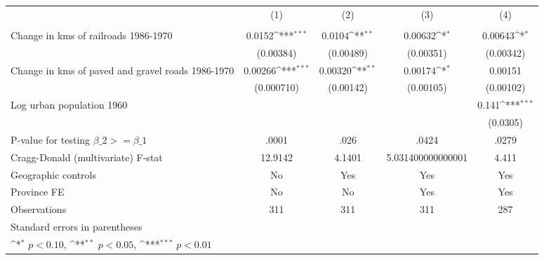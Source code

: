 {
\def\sym#1{\ifmmode^{#1}\else\(^{#1}\)\fi}
\begin{tabular}{l*{4}{c}}
\hline\hline
                &\multicolumn{1}{c}{(1)}&\multicolumn{1}{c}{(2)}&\multicolumn{1}{c}{(3)}&\multicolumn{1}{c}{(4)}\\
                &\multicolumn{1}{c}{}&\multicolumn{1}{c}{}&\multicolumn{1}{c}{}&\multicolumn{1}{c}{}\\
\hline
Change in kms of railroads 1986-1970&   0.0152\sym{***}&   0.0104\sym{**} &  0.00632\sym{*}  &  0.00643\sym{*}  \\
                &(0.00384)         &(0.00489)         &(0.00351)         &(0.00342)         \\
[1em]
Change in kms of paved and gravel roads 1986-1970&  0.00266\sym{***}&  0.00320\sym{**} &  0.00174\sym{*}  &  0.00151         \\
                &(0.000710)         &(0.00142)         &(0.00105)         &(0.00102)         \\
[1em]
Log urban population 1960&                  &                  &                  &    0.141\sym{***}\\
                &                  &                  &                  & (0.0305)         \\
\hline
P-value for testing $\beta\_{2} >= \beta\_{1}$&    .0001         &     .026         &    .0424         &    .0279         \\
Cragg-Donald (multivariate) F-stat&  12.9142         &   4.1401         &5.031400000000001         &    4.411         \\
Geographic controls&       No         &      Yes         &      Yes         &      Yes         \\
Province FE     &       No         &       No         &      Yes         &      Yes         \\
Observations    &      311         &      311         &      311         &      287         \\
\hline\hline
\multicolumn{5}{l}{\footnotesize Standard errors in parentheses}\\
\multicolumn{5}{l}{\footnotesize \sym{*} \(p<0.10\), \sym{**} \(p<0.05\), \sym{***} \(p<0.01\)}\\
\end{tabular}
}
